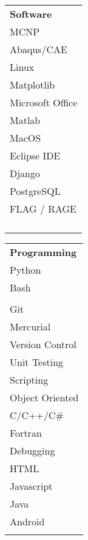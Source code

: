 \begin{minipage}{0.2\textwidth}
	\begin{center}
\begin{tabular}{l}
	{\large\textbf{Software}} \\
	\highskillbw \textsc{MCNP} \\
	\highskillbw Abaqus/CAE \\
	\highskillbw Linux \\ 
	\highskillbw Matplotlib \\ 
	\highskillbw Microsoft Office \\
	\highskillbw Matlab \\
	\highskillbw MacOS \\
	\medskillbw Eclipse IDE \\
	\medskillbw Django  \\
	\medskillbw PostgreSQL \\
	\lowskillbw FLAG / RAGE
	\\
	\\
	\\
	\\
	\\
\end{tabular}
	\end{center}
\end{minipage}%
\begin{minipage}{0.23\textwidth}
	\begin{center}
\begin{tabular}{l}
	{\large\textbf{Programming}} \\
	\highskillbw Python \\
	\highskillbw Bash \\ 
	\highskillbw {\fontfamily{ptm}\selectfont \LaTeX} \\ 
	\highskillbw Git \\
	\highskillbw Mercurial \\
	\highskillbw Version Control \\
	\highskillbw Unit Testing \\
	\highskillbw Scripting \\ 
	\medskillbw Object Oriented \\
	\medskillbw C/C++/C\# \\
	\medskillbw Fortran \\
	\medskillbw Debugging \\
	\lowskillbw HTML \\
	\lowskillbw Javascript \\
	\lowskillbw Java \\
	\lowskillbw Android \\
	\\
\end{tabular}
	\end{center}
\end{minipage}%
